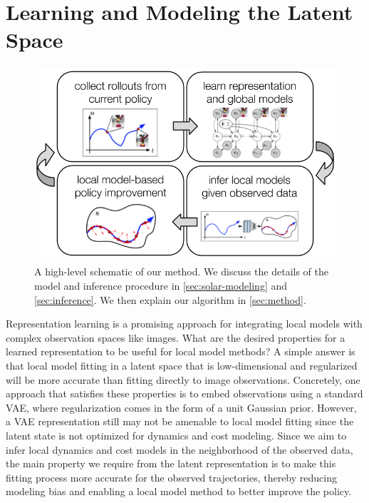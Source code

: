 \section{Learning and Modeling the Latent Space}
\label{sec:solar-modeling}

\begin{figure}
    \centering
    \includegraphics[width=0.9\linewidth]{img/solar/alg.png}
    \caption{A high-level schematic of our method. We discuss the details of the model and inference procedure in \autoref{sec:solar-modeling} and \autoref{sec:inference}. We then explain our algorithm in \autoref{sec:method}.}
    \label{fig:alg}
    \vspace{-.5em}
\end{figure}

Representation learning is a promising approach for integrating local models with complex observation spaces like images. What are the desired properties for a learned representation to be useful for local model methods? A simple answer is that local model fitting in a latent space that is low-dimensional and regularized will be more accurate than fitting directly to image observations. Concretely, one approach that satisfies these properties is to embed observations using a standard VAE, where regularization comes in the form of a unit Gaussian prior. However, a VAE representation still may not be amenable to local model fitting since the latent state is not optimized for dynamics and cost modeling. Since we aim to infer local dynamics and cost models in the neighborhood of the observed data, the main property we require from the latent representation is to make this fitting process more accurate for the observed trajectories, thereby reducing modeling bias and enabling a local model method to better improve the policy.

